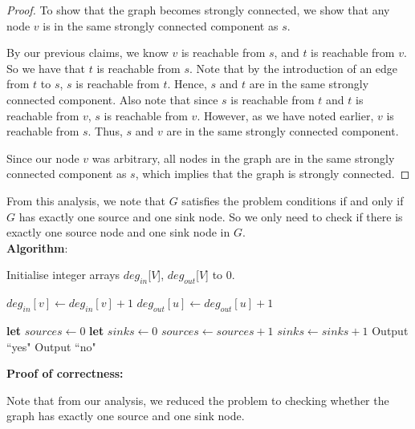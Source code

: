 \documentclass[answers]{exam}
\begin{document}
\begin{questions}
\begin{parts}
\begin{solution}
\begin{enumerate}
\begin{proof}
    To show that the graph becomes strongly connected, we show that any node $v$ is in the same strongly connected component as $s$.
    
    By our previous claims, we know $v$ is reachable from $s$, and $t$ is reachable from $v$. So we have that $t$ is reachable from $s$. Note that by the introduction of an edge from $t$ to $s$, $s$ is reachable from $t$. Hence, $s$ and $t$ are in the same strongly connected component. Also note that since $s$ is reachable from $t$ and $t$ is reachable from $v$, $s$ is reachable from $v$. However, as we have noted earlier, $v$ is reachable from $s$. Thus, $s$ and $v$ are in the same strongly connected component.
    
    Since our node $v$ was arbitrary, all nodes in the graph are in the same strongly connected component as $s$, which implies that the graph is strongly connected.
    \end{proof}
    
\end{enumerate}

From this analysis, we note that $G$ satisfies the problem conditions if and only if $G$ has exactly one source and one sink node. So we only need to check if there is exactly one source node and one sink node in $G$.\\

\textbf{Algorithm}:

\begin{algorithmic}[1]

\State Initialise integer arrays $deg_{in}$[$V$], $deg_{out}$[$V$] to $0$.

\State $deg_{in} \left[ v \right] \gets deg_{in} \left[ v \right] + 1$
\State $deg_{out} \left[ u \right] \gets deg_{out} \left[ u \right] + 1$
\EndFor
\EndFor

\State \textbf{let} $sources \gets 0$
\State \textbf{let} $sinks \gets 0$
\State $sources \gets sources + 1$
\EndIf
{}
\State $sinks \gets sinks + 1$
\EndIf
\EndFor
{}
\State Output ``yes"
\Else
\State Output ``no"
\EndIf
\EndProcedure
\end{algorithmic}

\textbf{Proof of correctness:}

Note that from our analysis, we reduced the problem to checking whether the graph has exactly one source and one sink node. 


\end{solution}
\end{parts}
\end{questions}
\end{document}
